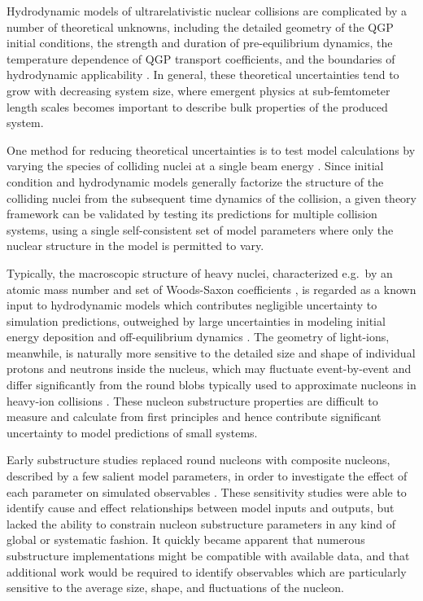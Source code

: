 \documentclass[aps,prc,reprint,amsmath,nofootinbib]{revtex4-1}
\begin{document}
Hydrodynamic models of ultrarelativistic nuclear collisions are complicated by a number of theoretical unknowns, including the detailed geometry of the QGP initial conditions, the strength and duration of pre-equilibrium dynamics, the temperature dependence of QGP transport coefficients, and the boundaries of hydrodynamic applicability \cite{Niemi:2014lha, deSouza:2015ena, Ollitrault:2012cm, Song:2012ua}.
In general, these theoretical uncertainties tend to grow with decreasing system size, where emergent physics at sub-femtometer length scales becomes important to describe bulk properties of the produced system.

One method for reducing theoretical uncertainties is to test model calculations by varying the species of colliding nuclei at a single beam energy \cite{Adare:2015bua, Schenke:2014tga, Aidala:2018mcw, Adare:2017wlc, Adamczyk:2015obl, Shen:2016zpp, Aidala:2017ajz, Adare:2006ti}.
Since initial condition and hydrodynamic models generally factorize the structure of the colliding nuclei from the subsequent time dynamics of the collision, a given theory framework can be validated by testing its predictions for multiple collision systems, using a single self-consistent set of model parameters where only the nuclear structure in the model is permitted to vary.

Typically, the macroscopic structure of heavy nuclei, characterized e.g.\ by an atomic mass number and set of Woods-Saxon coefficients \cite{MOLLER1995185, DEVRIES1987495}, is regarded as a known input to hydrodynamic models which contributes negligible uncertainty to simulation predictions, outweighed by large uncertainties in modeling initial energy deposition and off-equilibrium dynamics \cite{Niemi:2014lha, Song:2011hk, Retinskaya:2013gca, Liu:2015nwa, Kurkela:2016vts}.
The geometry of light-ions, meanwhile, is naturally more sensitive to the detailed size and shape of individual protons and neutrons inside the nucleus, which may fluctuate event-by-event and differ significantly from the round blobs typically used to approximate nucleons in heavy-ion collisions \cite{Schenke:2014zha, Welsh:2016siu, Moreland:2017kdx, Schenke:2014gaa, Schlichting:2014ipa}.
These nucleon substructure properties are difficult to measure and calculate from first principles and hence contribute significant uncertainty to model predictions of small systems.

Early substructure studies replaced round nucleons with composite nucleons, described by a few salient model parameters, in order to investigate the effect of each parameter on simulated observables \cite{Adler:2013aqf, Mitchell:2016jio, Welsh:2016siu, Broniowski:2016pvx, Bozek:2017jog}.
These sensitivity studies were able to identify cause and effect relationships between model inputs and outputs, but lacked the ability to constrain nucleon substructure parameters in any kind of global or systematic fashion.
It quickly became apparent that numerous substructure implementations might be compatible with available data, and that additional work would be required to identify observables which are particularly sensitive to the average size, shape, and fluctuations of the nucleon.
\end{document}
